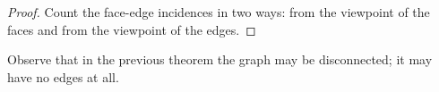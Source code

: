 

\setcounter{section}{3}
\setcounter{subsection}{2}
\setcounter{dfn}{6}

\begin{proof}
Count the face-edge incidences in two ways:
from the viewpoint of the faces and from the viewpoint of the edges.
\end{proof}
Observe that in the previous theorem the graph may be disconnected; it may have no edges at all.




